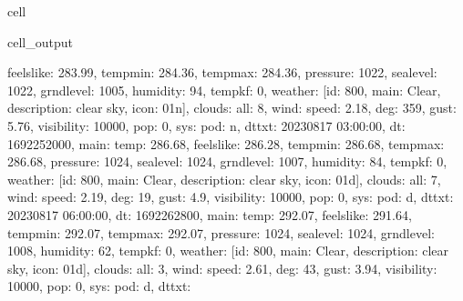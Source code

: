 \documentclass[letterpaper,10pt,english]{jupyterBook}
\begin{document}
\begin{sphinxuseclass}{cell}
\begin{sphinxVerbatimOutput}
\begin{sphinxuseclass}{cell_output}
\begin{sphinxVerbatim}[commandchars=\\\{\}]
\PYGZsq{}feels\PYGZus{}like\PYGZsq{}: 283.99, \PYGZsq{}temp\PYGZus{}min\PYGZsq{}: 284.36, \PYGZsq{}temp\PYGZus{}max\PYGZsq{}: 284.36, \PYGZsq{}pressure\PYGZsq{}: 1022, \PYGZsq{}sea\PYGZus{}level\PYGZsq{}: 1022, \PYGZsq{}grnd\PYGZus{}level\PYGZsq{}: 1005, \PYGZsq{}humidity\PYGZsq{}: 94, \PYGZsq{}temp\PYGZus{}kf\PYGZsq{}: 0\PYGZcb{}, \PYGZsq{}weather\PYGZsq{}: [\PYGZob{}\PYGZsq{}id\PYGZsq{}: 800, \PYGZsq{}main\PYGZsq{}: \PYGZsq{}Clear\PYGZsq{}, \PYGZsq{}description\PYGZsq{}: \PYGZsq{}clear sky\PYGZsq{}, \PYGZsq{}icon\PYGZsq{}: \PYGZsq{}01n\PYGZsq{}\PYGZcb{}], \PYGZsq{}clouds\PYGZsq{}: \PYGZob{}\PYGZsq{}all\PYGZsq{}: 8\PYGZcb{}, \PYGZsq{}wind\PYGZsq{}: \PYGZob{}\PYGZsq{}speed\PYGZsq{}: 2.18, \PYGZsq{}deg\PYGZsq{}: 359, \PYGZsq{}gust\PYGZsq{}: 5.76\PYGZcb{}, \PYGZsq{}visibility\PYGZsq{}: 10000, \PYGZsq{}pop\PYGZsq{}: 0, \PYGZsq{}sys\PYGZsq{}: \PYGZob{}\PYGZsq{}pod\PYGZsq{}: \PYGZsq{}n\PYGZsq{}\PYGZcb{}, \PYGZsq{}dt\PYGZus{}txt\PYGZsq{}: \PYGZsq{}2023\PYGZhy{}08\PYGZhy{}17 03:00:00\PYGZsq{}\PYGZcb{}, \PYGZob{}\PYGZsq{}dt\PYGZsq{}: 1692252000, \PYGZsq{}main\PYGZsq{}: \PYGZob{}\PYGZsq{}temp\PYGZsq{}: 286.68, \PYGZsq{}feels\PYGZus{}like\PYGZsq{}: 286.28, \PYGZsq{}temp\PYGZus{}min\PYGZsq{}: 286.68, \PYGZsq{}temp\PYGZus{}max\PYGZsq{}: 286.68, \PYGZsq{}pressure\PYGZsq{}: 1024, \PYGZsq{}sea\PYGZus{}level\PYGZsq{}: 1024, \PYGZsq{}grnd\PYGZus{}level\PYGZsq{}: 1007, \PYGZsq{}humidity\PYGZsq{}: 84, \PYGZsq{}temp\PYGZus{}kf\PYGZsq{}: 0\PYGZcb{}, \PYGZsq{}weather\PYGZsq{}: [\PYGZob{}\PYGZsq{}id\PYGZsq{}: 800, \PYGZsq{}main\PYGZsq{}: \PYGZsq{}Clear\PYGZsq{}, \PYGZsq{}description\PYGZsq{}: \PYGZsq{}clear sky\PYGZsq{}, \PYGZsq{}icon\PYGZsq{}: \PYGZsq{}01d\PYGZsq{}\PYGZcb{}], \PYGZsq{}clouds\PYGZsq{}: \PYGZob{}\PYGZsq{}all\PYGZsq{}: 7\PYGZcb{}, \PYGZsq{}wind\PYGZsq{}: \PYGZob{}\PYGZsq{}speed\PYGZsq{}: 2.19, \PYGZsq{}deg\PYGZsq{}: 19, \PYGZsq{}gust\PYGZsq{}: 4.9\PYGZcb{}, \PYGZsq{}visibility\PYGZsq{}: 10000, \PYGZsq{}pop\PYGZsq{}: 0, \PYGZsq{}sys\PYGZsq{}: \PYGZob{}\PYGZsq{}pod\PYGZsq{}: \PYGZsq{}d\PYGZsq{}\PYGZcb{}, \PYGZsq{}dt\PYGZus{}txt\PYGZsq{}: \PYGZsq{}2023\PYGZhy{}08\PYGZhy{}17 06:00:00\PYGZsq{}\PYGZcb{}, \PYGZob{}\PYGZsq{}dt\PYGZsq{}: 1692262800, \PYGZsq{}main\PYGZsq{}: \PYGZob{}\PYGZsq{}temp\PYGZsq{}: 292.07, \PYGZsq{}feels\PYGZus{}like\PYGZsq{}: 291.64, \PYGZsq{}temp\PYGZus{}min\PYGZsq{}: 292.07, \PYGZsq{}temp\PYGZus{}max\PYGZsq{}: 292.07, \PYGZsq{}pressure\PYGZsq{}: 1024, \PYGZsq{}sea\PYGZus{}level\PYGZsq{}: 1024, \PYGZsq{}grnd\PYGZus{}level\PYGZsq{}: 1008, \PYGZsq{}humidity\PYGZsq{}: 62, \PYGZsq{}temp\PYGZus{}kf\PYGZsq{}: 0\PYGZcb{}, \PYGZsq{}weather\PYGZsq{}: [\PYGZob{}\PYGZsq{}id\PYGZsq{}: 800, \PYGZsq{}main\PYGZsq{}: \PYGZsq{}Clear\PYGZsq{}, \PYGZsq{}description\PYGZsq{}: \PYGZsq{}clear sky\PYGZsq{}, \PYGZsq{}icon\PYGZsq{}: \PYGZsq{}01d\PYGZsq{}\PYGZcb{}], \PYGZsq{}clouds\PYGZsq{}: \PYGZob{}\PYGZsq{}all\PYGZsq{}: 3\PYGZcb{}, \PYGZsq{}wind\PYGZsq{}: \PYGZob{}\PYGZsq{}speed\PYGZsq{}: 2.61, \PYGZsq{}deg\PYGZsq{}: 43, \PYGZsq{}gust\PYGZsq{}: 3.94\PYGZcb{}, \PYGZsq{}visibility\PYGZsq{}: 10000, \PYGZsq{}pop\PYGZsq{}: 0, \PYGZsq{}sys\PYGZsq{}: \PYGZob{}\PYGZsq{}pod\PYGZsq{}: \PYGZsq{}d\PYGZsq{}\PYGZcb{}, \PYGZsq{}dt\PYGZus{}txt\PYGZsq{}: 
\end{sphinxVerbatim}
\end{sphinxuseclass}
\end{sphinxVerbatimOutput}
\end{sphinxuseclass}
\end{document}

